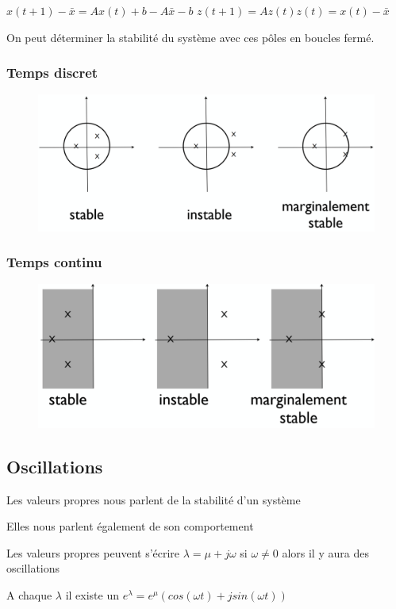 \documentclass[resume]{subfiles}
\begin{document}
$x(t + 1)-\bar{x} = Ax(t) + b - A\bar{x}-b$
$z(t + 1) = Az(t) z(t) = x(t) - \bar{x}$ 

On peut déterminer la stabilité du système avec ces pôles en boucles fermé.

\subsubsection{Temps discret}

\begin{figure}[H]
    \centering
    \includegraphics[width=0.8\columnwidth]{Figures/Stabilite_1.png}
\end{figure}

\subsubsection{Temps continu}

\begin{figure}[H]
    \centering
    \includegraphics[width=0.8\columnwidth]{Figures/Stabilite_2.png}
\end{figure}

\subsection{Oscillations}

Les valeurs propres nous parlent de la stabilité d'un système  

Elles nous parlent également de son comportement  

Les valeurs propres peuvent s'écrire $\lambda=\mu+j\omega$ si $\omega \neq 0$ alors il y aura des oscillations

A chaque $\lambda$ il existe un $e^{\lambda}=e^{\mu}(cos(\omega t)+jsin(\omega t))$ 
\end{document}
